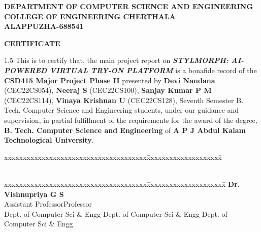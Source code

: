 \documentclass[12pt,a4paper,oneside]{report}
\begin{document}
\begin{titlepage}
\begin{center}
\large{\textbf{DEPARTMENT OF COMPUTER SCIENCE AND ENGINEERING}}\\
\large{\textbf{COLLEGE OF ENGINEERING CHERTHALA\\ALAPPUZHA-688541}}\\
\end{center}
\begin{figure}[h]
\begin{center}
\end{center}
\end{figure}
\begin{center}
\large{\textbf{CERTIFICATE}}\\
\end{center}
\begin{spacing}{1.5}
This is to certify that, the main project report on \textbf{\textit{STYLMORPH: AI-POWERED VIRTUAL TRY-ON PLATFORM}} is a bonafide record of the \textbf{CSD415 Major Project Phase II} presented by \textbf{Devi Nandana} (CEC22CS054), \textbf{Neeraj S} (CEC22CS100), \textbf{Sanjay Kumar P M} (CEC22CS114), \textbf{Vinaya Krishnan U} (CEC22CS128), Seventh Semester B. Tech. Computer Science and Engineering students, under our guidance and supervision, in partial fulfillment of the requirements for the award of the degree, \textbf{B. Tech. Computer Science and Engineering} of \textbf{A P J Abdul Kalam Technological University}.
\end{spacing}
\begin{tabbing}
xxxxxxxxxxxxxxxxxxxxxxxxxxxxxxxxxxxxxx\= xxxxxxxxxxxxxxxxxxxx\= \kill
\hspace{.15in}{\bf Guide}\> \>\hspace{-.16in}{\bf HoD} \\
\\
\end{tabbing}
\begin{tabbing}
xxxxxxxxxxxxxxxxxxxxxxxxxxxxxxxxxxxxxx\= xxxxxxxxxxxxxxxxxxxxx\= \kill
{}\>\hspace{-.75in} {\bf{Dr. Vishnupriya G S}} \> \\
\hspace{.1in} Assistant Professor\>\>\hspace{-.24in}Professor\\\hspace{.1in} Dept. of Computer Sci \& Engg \>\hspace{-0.70in}Dept. of Computer Sci \& Engg\>\hspace{-.28in} Dept. of Computer Sci \& Engg\\
\end{tabbing}
\end{titlepage}
\end{document}
